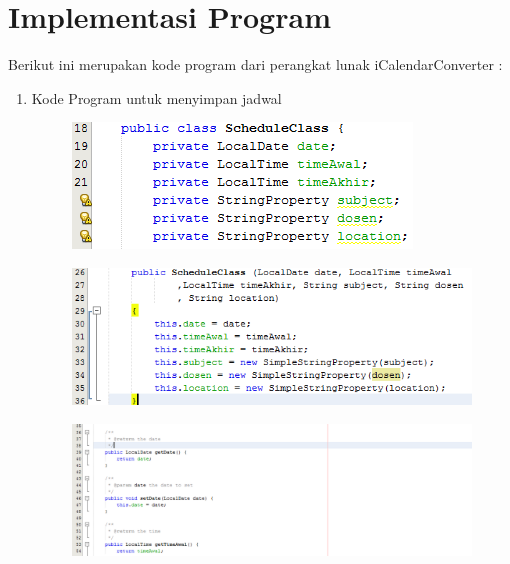 \section{Implementasi Program}
Berikut ini merupakan kode program dari perangkat lunak iCalendarConverter :
\begin{enumerate}
	\item Kode Program untuk menyimpan jadwal
		\begin{figure}[H]
		\includegraphics[scale=0.8]{Gambar/scheduleClass}
		\end{figure}
		\begin{figure}[H]
		\includegraphics[scale=0.8]{Gambar/scheduleClass5}
		\end{figure}
		\begin{figure}[H]
		\includegraphics[scale=0.8]{Gambar/scheduleClass1}
		\end{figure}
		\begin{figure}[H]

\end{figure}
\end{enumerate}
